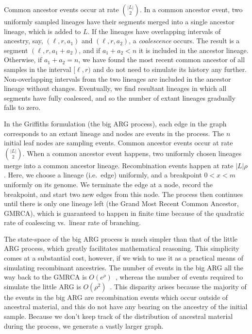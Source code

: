\documentclass{article}
\begin{document}
Common ancestor events occur at rate $\binom{|L|}{2}$.
In a common ancestor event, two uniformly sampled lineages have their segments
merged into a single ancestor lineage, which is added to $L$.
If the lineages have overlapping intervals of ancestry,
say, $(\ell, r, a_1)$ and $(\ell, r, a_2)$, a
\emph{coalescence} occurs. The result is a segment
$(\ell, r, a_1 + a_2)$, and if $a_1 + a_2 < n$ it is included in the
ancestor lineage. Otherwise, if $a_1 + a_2 = n$, we have found
the most recent common ancestor of all samples in the interval $[\ell, r)$
and do not need to simulate its history any further.
Non-overlapping intervals from the two lineages are included
 in the ancestor lineage without changes. Eventually,
we find resultant lineages in which all segments have fully coalesced,
and so the number of extant lineages gradually falls to zero.

In the Griffiths formulation (the big ARG process), each edge in the graph corresponds to an extant
lineage and nodes are events in the process. The $n$ initial leaf nodes are
sampling events. Common ancestor events occur at rate $\binom{|L|}{2}$.
When a common ancestor event happens, two uniformly chosen lineages
merge into a common ancestor lineage.
Recombination events happen at rate $|L| \rho$. Here, we choose a lineage (i.e.\ edge) uniformly,
and a breakpoint $0 < x < m$ uniformly on its genome. We terminate the edge at a
node, record the breakpoint, and start two new edges from this node. The process
then continues until there is only one lineage left (the Grand Most Recent
Common Ancestor, GMRCA), which is guaranteed to
happen in finite time because of the quadratic rate of coalescing vs.\ linear rate of branching.

The state-space of the big ARG process is much simpler than that of the little ARG process,
which greatly facilitates mathematical reasoning. This simplicity comes at a
substantial cost, however, if we wish to use it as a practical means of
simulating recombinant ancestries.
The number of events in the big ARG all the way back to the GMRCA
is $O(e^\rho)$~\citep{griffiths1997ancestral}, whereas the number
of events required to simulate the little ARG is
$O(\rho^2)$~\citep{hein2004gene,baumdicker2021efficient}.
This disparity arises because the majority of the events in the big ARG are
recombination events which occur outside of ancestral material,
and this do not have any bearing on the ancestry of the initial sample.
Because we don't keep track of the distribution of ancestral material during the process,
we generate a vastly larger graph.
\end{document}
